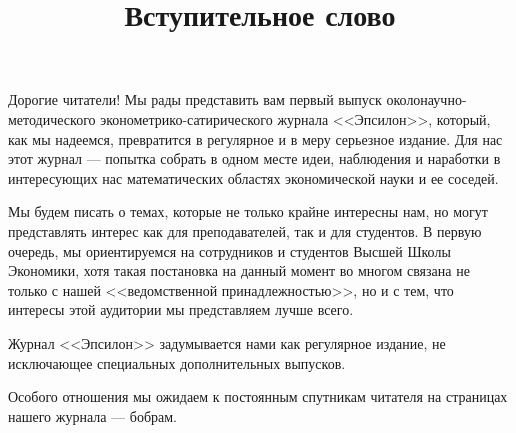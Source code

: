\documentclass[final,pdftex]{../../template/epsilonj}
\begin{document}
\setcounter{page}{2}

\begin{frontmatter}
\title{Вступительное слово}







\end{frontmatter}




Дорогие читатели! Мы рады представить вам первый выпуск околонаучно-методического эконометрико-сатирического журнала <<Эпсилон>>, 
который, как мы надеемся, превратится в регулярное и в меру серьезное издание. 
Для нас этот журнал --- попытка
собрать в одном месте идеи, наблюдения и наработки в интересующих нас
математических областях экономической науки и ее соседей.

Мы будем писать о темах, которые не только крайне интересны нам, но могут представлять интерес как для преподавателей, так и для студентов. 
В первую очередь, мы ориентируемся на сотрудников и студентов Высшей Школы Экономики, хотя такая постановка на данный
момент во многом связана не только с нашей <<ведомственной
принадлежностью>>, но и с тем, что интересы этой аудитории мы представляем лучше всего.

Журнал <<Эпсилон>> задумывается нами как регулярное издание, не
исключающее специальных дополнительных выпусков. 


Особого отношения мы ожидаем к постоянным
спутникам читателя на страницах нашего журнала --- бобрам.
\end{document}
